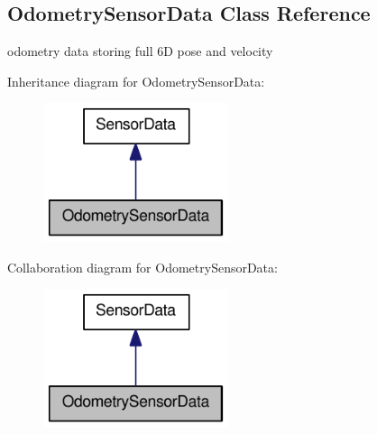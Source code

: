 \hypertarget{classOpenRAVE_1_1SensorBase_1_1OdometrySensorData}{
\subsection{OdometrySensorData Class Reference}
\label{classOpenRAVE_1_1SensorBase_1_1OdometrySensorData}
}


odometry data storing full 6D pose and velocity  




Inheritance diagram for OdometrySensorData:\nopagebreak
\begin{figure}[H]
\begin{center}
\leavevmode
\includegraphics[width=154pt]{classOpenRAVE_1_1SensorBase_1_1OdometrySensorData__inherit__graph}
\end{center}
\end{figure}


Collaboration diagram for OdometrySensorData:\nopagebreak
\begin{figure}[H]
\begin{center}
\leavevmode
\includegraphics[width=154pt]{classOpenRAVE_1_1SensorBase_1_1OdometrySensorData__coll__graph}
\end{center}
\end{figure}

